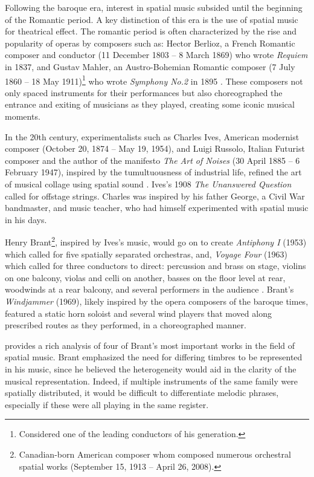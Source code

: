 Following the baroque era, interest in spatial music subsided until the beginning of the Romantic period. A key distinction of this era is the use of spatial music for theatrical effect. The romantic period is often characterized by the rise and popularity of operas by composers such as: Hector Berlioz, a French Romantic composer and conductor (11 December 1803 – 8 March 1869) who wrote \textit{Requiem} in 1837, and Gustav Mahler, an Austro-Bohemian Romantic composer (7 July 1860 – 18 May 1911)\footnote{Considered one of the leading conductors of his generation.} who wrote \textit{Symphony No.2} in 1895 \cite{einstein1948music}. These composers not only spaced instruments for their performances but also choreographed the entrance and exiting of musicians as they played, creating some iconic musical moments.

In the 20th century, experimentalists such as Charles Ives, American modernist composer (October 20, 1874 – May 19, 1954), and Luigi Russolo, Italian Futurist composer and the author of the manifesto \textit{The Art of Noises} (30 April 1885 – 6 February 1947), inspired by the tumultuousness of industrial life, refined the art of musical collage using spatial sound \cite{jones199120th}. Ives's 1908 \textit{The Unanswered Question} called for offstage strings. Charles was inspired by his father George, a Civil War bandmaster, and music teacher, who had himself experimented with spatial music in his days. 

Henry Brant\footnote{Canadian-born American composer whom composed numerous orchestral spatial works (September 15, 1913 – April 26, 2008).}, inspired by Ives's music, would go on to create \textit{Antiphony I} (1953) which called for five spatially separated orchestras, and, \textit{Voyage Four} (1963) which called for three conductors to direct: percussion and brass on stage, violins on one balcony, violas and celli on another, basses on the floor level at rear, woodwinds at a rear balcony, and several performers in the audience \cite{zvonar1999history}. Brant's \textit{Windjammer} (1969), likely inspired by the opera composers of the baroque times, featured a static horn soloist and several wind players that moved along prescribed routes as they performed, in a choreographed manner. 

\cite{harley1997american} provides a rich analysis of four of Brant's most important works in the field of spatial music. Brant emphasized the need for differing timbres to be represented in his music, since he believed the heterogeneity would aid in the clarity of the musical representation. Indeed, if multiple instruments of the same family were spatially distributed, it would be difficult to differentiate melodic phrases, especially if these were all playing in the same register. 

